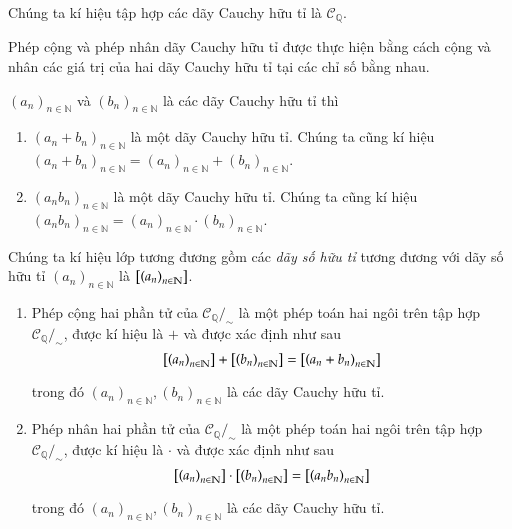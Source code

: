 Chúng ta kí hiệu tập hợp các dãy Cauchy hữu tỉ là $\mathscr{C}_{\mathbb{Q}}$.

Phép cộng và phép nhân dãy Cauchy hữu tỉ được thực hiện bằng cách cộng và nhân các giá trị của hai dãy Cauchy hữu tỉ tại các chỉ số bằng nhau.

\begin{theorem}\label{theorem:addition-and-multiplication-of-rational-cauchy-sequences}
	${(a_{n})}_{n\in\mathbb{N}}$ và ${(b_{n})}_{n\in\mathbb{N}}$ là các dãy Cauchy hữu tỉ thì
	\begin{enumerate}[label={(\roman*)}]
		\item ${(a_{n} + b_{n})}_{n\in\mathbb{N}}$ là một dãy Cauchy hữu tỉ. Chúng ta cũng kí hiệu ${(a_{n} + b_{n})}_{n\in\mathbb{N}} = {(a_{n})}_{n\in\mathbb{N}} + {(b_{n})}_{n\in\mathbb{N}}$.
		\item ${(a_{n}b_{n})}_{n\in\mathbb{N}}$ là một dãy Cauchy hữu tỉ. Chúng ta cũng kí hiệu ${(a_{n}b_{n})}_{n\in\mathbb{N}} = {(a_{n})}_{n\in\mathbb{N}}\cdot {(b_{n})}_{n\in\mathbb{N}}$.
	\end{enumerate}
\end{theorem}

\begin{definition}
	Chúng ta kí hiệu lớp tương đương gồm các \textit{dãy số hữu tỉ} tương đương với dãy số hữu tỉ ${(a_{n})}_{n\in\mathbb{N}}$ là $\left[{\left({a_{n}}\right)}_{{n}\in\mathbb{N}}\right]$.

	\begin{enumerate}[label={(\roman*)}]
		\item Phép cộng hai phần tử của $\mathscr{C}_{\mathbb{Q}}/_{\sim}$ là một phép toán hai ngôi trên tập hợp $\mathscr{C}_{\mathbb{Q}}/_{\sim}$, được kí hiệu là $+$ và được xác định như sau
		      \[
			      \left[{\left({a_{n}}\right)}_{{n}\in\mathbb{N}}\right] + \left[{\left({b_{n}}\right)}_{{n}\in\mathbb{N}}\right] = \left[{\left({a_{n} + b_{n}}\right)}_{{n}\in\mathbb{N}}\right]
		      \]

		      trong đó ${(a_{n})}_{n\in\mathbb{N}}, {(b_{n})}_{n\in\mathbb{N}}$ là các dãy Cauchy hữu tỉ.
		\item Phép nhân hai phần tử của $\mathscr{C}_{\mathbb{Q}}/_{\sim}$ là một phép toán hai ngôi trên tập hợp $\mathscr{C}_{\mathbb{Q}}/_{\sim}$, được kí hiệu là $\cdot$ và được xác định như sau
		      \[
			      \left[{\left({a_{n}}\right)}_{{n}\in\mathbb{N}}\right] \cdot \left[{\left({b_{n}}\right)}_{{n}\in\mathbb{N}}\right] = \left[{\left({a_{n}b_{n}}\right)}_{{n}\in\mathbb{N}}\right]
		      \]

		      trong đó ${(a_{n})}_{n\in\mathbb{N}}, {(b_{n})}_{n\in\mathbb{N}}$ là các dãy Cauchy hữu tỉ.
	\end{enumerate}
\end{definition}

